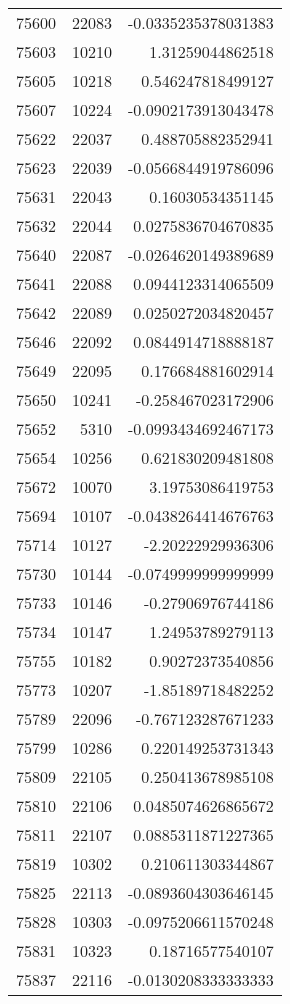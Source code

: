 \begin{tabular}{r | r | r}
75600 & 22083 & -0.0335235378031383 \\
75603 & 10210 & 1.31259044862518 \\
75605 & 10218 & 0.546247818499127 \\
75607 & 10224 & -0.0902173913043478 \\
75622 & 22037 & 0.488705882352941 \\
75623 & 22039 & -0.0566844919786096 \\
75631 & 22043 & 0.16030534351145 \\
75632 & 22044 & 0.0275836704670835 \\
75640 & 22087 & -0.0264620149389689 \\
75641 & 22088 & 0.0944123314065509 \\
75642 & 22089 & 0.0250272034820457 \\
75646 & 22092 & 0.0844914718888187 \\
75649 & 22095 & 0.176684881602914 \\
75650 & 10241 & -0.258467023172906 \\
75652 & 5310 & -0.0993434692467173 \\
75654 & 10256 & 0.621830209481808 \\
75672 & 10070 & 3.19753086419753 \\
75694 & 10107 & -0.0438264414676763 \\
75714 & 10127 & -2.20222929936306 \\
75730 & 10144 & -0.0749999999999999 \\
75733 & 10146 & -0.27906976744186 \\
75734 & 10147 & 1.24953789279113 \\
75755 & 10182 & 0.90272373540856 \\
75773 & 10207 & -1.85189718482252 \\
75789 & 22096 & -0.767123287671233 \\
75799 & 10286 & 0.220149253731343 \\
75809 & 22105 & 0.250413678985108 \\
75810 & 22106 & 0.0485074626865672 \\
75811 & 22107 & 0.0885311871227365 \\
75819 & 10302 & 0.210611303344867 \\
75825 & 22113 & -0.0893604303646145 \\
75828 & 10303 & -0.0975206611570248 \\
75831 & 10323 & 0.18716577540107 \\
75837 & 22116 & -0.0130208333333333 \\

\end{tabular}
